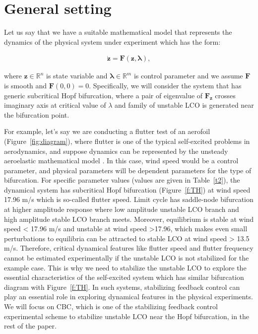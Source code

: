 \documentclass[openacc]{rsproca_new}%
\def\real{\mathbb{R}}
\def\vec#1{\ensuremath{\mathbf{#1}}}
\newcommand{\Fref}[1]{Figure~\ref{#1}}
\newcommand{\Tref}[1]{Table~\ref{#1}}
\begin{document}
\section{General setting}\label{GS}
Let us say that we have a suitable mathematical model that represents the dynamics of the physical system under experiment which has the form:

\begin{align}\label{eq:gs}
  \dot{\vec{z}} =\vec{F}(\vec{z},\vec{\lambda}),
\end{align}

\noindent where \(\vec{z}\in \real^n\) is state variable and \(\vec{\lambda}\in\real^m\) is control parameter and we assume $\vec{F}$ is smooth and \(\vec{F}(0,0)=0\). Specifically, we will consider the system that has generic subcritical Hopf bifurcation, where a pair of eigenvalue of $\vec{F}_\vec{z}$ crosses imaginary axis at critical value of $\lambda$ and family of unstable LCO is generated near the bifurcation point.

For example, let's say we are conducting a flutter test of an aerofoil (\Fref{fig:diagram}), where flutter \cite{dimitriadis2017introduction} is one of the typical self-excited problems in aerodynamics, and suppose dynamics can be represented by the unsteady aeroelastic mathematical model \cite{abdelkefi2013analytical}. In this case, wind speed would be a control parameter, and physical parameters will be dependent parameters for the type of bifurcation. For specific parameter values (values are given in \Tref{t2}), the dynamical system has subcritical Hopf bifurcation (\Fref{f:TH}) at wind speed 17.96 m/s which is so-called flutter speed. Limit cycle has saddle-node bifurcation at higher amplitude response where low amplitude unstable LCO branch and high amplitude stable LCO branch meets. Moreover, equilibrium is stable at wind speed < 17.96 m/s and unstable at wind speed >17.96, which makes even small perturbations to equilibria can be attracted to stable LCO at wind speed > 13.5 m/s. Therefore, critical dynamical features like flutter speed and flutter frequency cannot be estimated experimentally if the unstable LCO is not stabilized for the example case. This is why we need to stabilize the unstable LCO to explore the essential characteristics of the self-excited system which has similar bifurcation diagram with \Fref{f:TH}. In such systems, stabilizing feedback control can play an essential role in exploring dynamical features in the physical experiments. We will focus on CBC, which is one of the stabilizing feedback control experimental scheme to stabilize unstable LCO near the Hopf bifurcation, in the rest of the paper.
\end{document}
